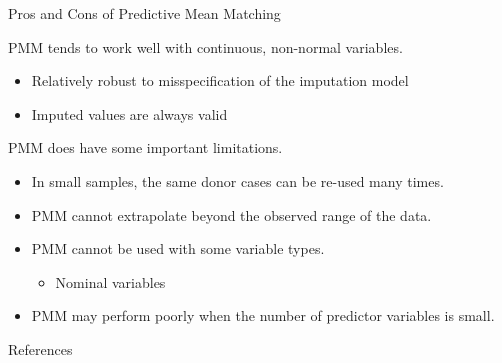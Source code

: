 \documentclass{beamer}\usepackage[]{graphicx}\usepackage[]{color}
\begin{document}
\watermarkon %

\begin{frame}{Pros and Cons of Predictive Mean Matching}
  
  PMM tends to work well with continuous, non-normal variables.
  \begin{itemize}
  \item Relatively robust to misspecification of the imputation model
  \item Imputed values are always valid
  \end{itemize}
  \vb
  PMM does have some important limitations.
  \begin{itemize}
  \item In small samples, the same donor cases can be re-used many times.
  \item PMM cannot extrapolate beyond the observed range of the data.
  \item PMM cannot be used with some variable types.
    \begin{itemize}
    \item Nominal variables
    \end{itemize}
  \item PMM may perform poorly when the number of predictor variables is small.
  \end{itemize}
  
\end{frame}


\begin{frame}[allowframebreaks]{References}
  
  
  
  
\end{frame}

\end{document}
